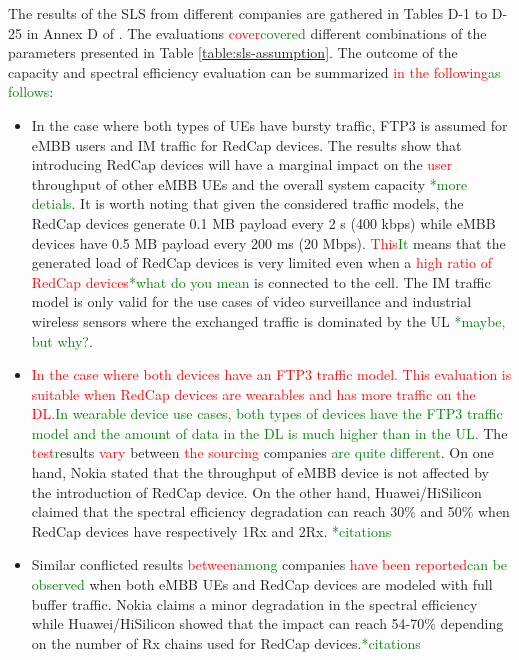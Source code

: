 \documentclass[]{IEEEtran}
\newcommand{\CAREPL}[2]{\textcolor{red}{#1}\textcolor{green}{#2}}
\begin{document}
The results of the SLS from different companies are gathered in Tables D-1 to D-25 in Annex D of \cite{3gpp_study_2021_38.875}. 
The evaluations \CAREPL{cover}{covered} different combinations of the parameters presented in Table \ref{table:sls-assumption}. 
The outcome of the capacity and spectral efficiency evaluation can be summarized \CAREPL{in the following}{as follows}:

\begin{itemize}
    \item In the case where both types of UEs have bursty traffic, FTP3 is assumed for eMBB users and IM traffic for RedCap devices. The results show that introducing RedCap devices will have a marginal impact on the \CAREPL{user}{} throughput of other eMBB UEs and the overall system capacity \CAREPL{}{*more detials}. 
    It is worth noting that given the considered traffic models, the RedCap devices generate 0.1 MB payload every 2 s (400 kbps) while eMBB devices have 0.5 MB payload every 200 ms (20 Mbps). 
    \CAREPL{This}{It} means that the generated load of RedCap devices is very limited even when a \CAREPL{high ratio of RedCap devices}{*what do you mean} is connected to the cell. 
    The IM traffic model is only valid for the use cases of video surveillance and industrial wireless sensors where the exchanged traffic is dominated by the UL \CAREPL{}{*maybe, but why?}.
    \item \CAREPL{In the case where both devices have an FTP3 traffic model. This evaluation is suitable when RedCap devices are wearables and has more traffic on the DL.}{In wearable device use cases, both types of devices have the FTP3 traffic model and the amount of data in the DL is much higher than in the UL.} 
    The \CAREPL{test} results \CAREPL{vary}{} between \CAREPL{the sourcing}{} companies \CAREPL{}{are quite different}. 
    On one hand, Nokia stated that the throughput of eMBB device is not affected by the introduction of RedCap device. On the other hand, Huawei/HiSilicon claimed that the spectral efficiency degradation can reach 30\% and 50\% when RedCap devices have respectively 1Rx and 2Rx. \CAREPL{}{*citations}
    \item Similar conflicted results \CAREPL{between}{among} companies \CAREPL{have been reported}{can be observed} when both eMBB UEs and RedCap devices are modeled with full buffer traffic. Nokia claims a minor degradation in the spectral efficiency while Huawei/HiSilicon showed that the impact can reach 54-70\% depending on the number of Rx chains used for RedCap devices.\CAREPL{}{*citations}
\end{itemize}
\end{document}
